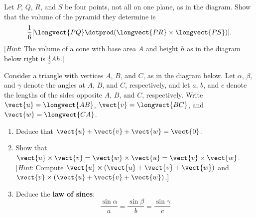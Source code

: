 \begin{multicols}{2}
\begin{ex}
\end{ex}

\begin{ex}
Let $P$, $Q$, $R$, and $S$ be four points, not all on one plane, as in the diagram. Show that the volume of the pyramid they determine is
\begin{equation*}
\frac{1}{6}|\longvect{PQ} \dotprod (\longvect{PR} \times \longvect{PS})|.
\end{equation*}
[\textit{Hint}: The volume of a cone with base area $A$ and height $h$ as in the diagram below right is $\frac{1}{3}Ah$.]


\begin{figure}[H]
\centering

\end{figure}
\end{ex}

\begin{ex} \label{ex:ch4_3_ex21}
Consider a triangle with vertices $A$, $B$, and $C$, as in the diagram below. Let $\alpha$, $\beta$, and $\gamma$ denote the angles at $A$, $B$, and $C$, respectively, and let $a$, $b$, and $c$ denote the lengths of the sides opposite $A$, $B$, and $C$, respectively. Write $\vect{u} = \longvect{AB}$, $\vect{v} = \longvect{BC}$, and $\vect{w} = \longvect{CA}$.


\begin{figure}[H]
\centering

\end{figure}

\begin{enumerate}[label={\alph*.}]
\item Deduce that $\vect{u} + \vect{v} + \vect{w} = \vect{0}$.

\item Show that $\vect{u} \times \vect{v} = \vect{w} \times \vect{u} = \vect{v} \times \vect{w}$. [\textit{Hint}: Compute $\vect{u} \times (\vect{u} + \vect{v} + \vect{w})$ and $\vect{v} \times (\vect{u} + \vect{v} + \vect{w})$.]

\item Deduce the \textbf{law of sines}:
\begin{equation*}
\frac{\sin\alpha}{a} = \frac{\sin\beta}{b} = \frac{\sin\gamma}{c}
\end{equation*}
\end{enumerate}
\end{ex}


\end{multicols}
